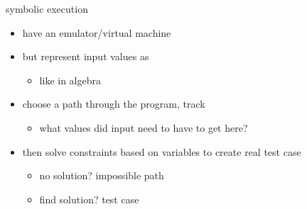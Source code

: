 
\begin{frame}{symbolic execution}
    \begin{itemize}
    \item have an emulator/virtual machine
    \item but represent input values as 
        \begin{itemize}
            \item like in algebra
        \end{itemize}
    \item choose a path through the program, track 
        \begin{itemize}
        \item what values did input need to have to get here?
        \end{itemize}
    \item then solve constraints based on variables to create real test case
        \begin{itemize}
        \item no solution? impossible path
        \item find solution? test case
        \end{itemize}
    \end{itemize}
\end{frame}

